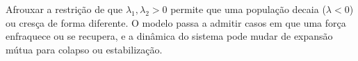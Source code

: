 Afrouxar a restrição de que $\lambda_{1},\lambda_{2}>0$ permite que uma população decaia ($\lambda<0$) ou cresça de forma diferente. O modelo passa a admitir casos em que uma força enfraquece ou se recupera, e a dinâmica do sistema pode mudar de expansão mútua para colapso ou estabilização. 